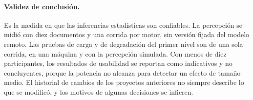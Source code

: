 \paragraph{Validez de conclusión.} Es la medida en que las inferencias estadísticas son confiables.
La percepción se midió con diez documentos y una corrida por motor, sin versión fijada del modelo
remoto. Las pruebas de carga y de degradación del primer nivel son de una sola corrida, en una
máquina y con la percepción simulada. Con menos de diez participantes, los resultados de usabilidad
se reportan como indicativos y no concluyentes, porque la potencia no alcanza para detectar un
efecto de tamaño medio. El historial de cambios de los proyectos anteriores no siempre describe lo
que se modificó, y los motivos de algunas decisiones se infieren.

